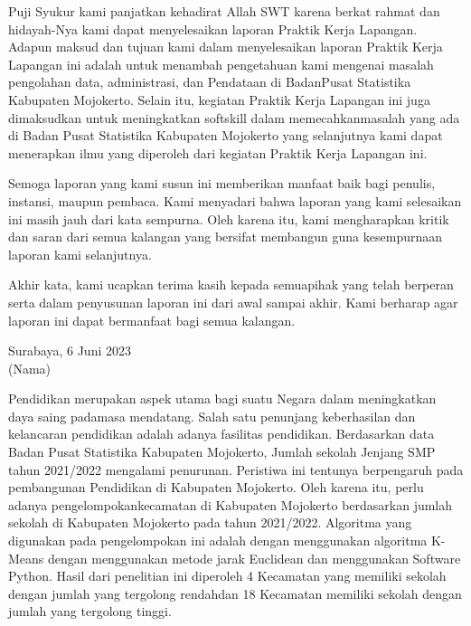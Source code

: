 \documentclass{LaporanPKL}
\begin{document}



\Awal
\HalamanJudul
\HalamanPengesahan
\Keaslian
\newpage
\KataPengantar

Puji  Syukur  kami  panjatkan  kehadirat  Allah  SWT  karena  berkat  rahmat  dan hidayah-Nya kami dapat menyelesaikan laporan Praktik Kerja Lapangan. Adapun maksud dan tujuan kami dalam menyelesaikan laporan Praktik Kerja Lapangan ini adalah  untuk  menambah  pengetahuan  kami  mengenai  masalah  pengolahan  data, administrasi, dan Pendataan di BadanPusat Statistika Kabupaten Mojokerto. Selain itu,  kegiatan Praktik  Kerja  Lapangan ini  juga  dimaksudkan  untuk  meningkatkan softskill dalam memecahkanmasalah yang ada di Badan Pusat Statistika Kabupaten Mojokerto  yang  selanjutnya kami dapat  menerapkan  ilmu  yang diperoleh  dari kegiatan Praktik Kerja Lapangan ini.

Semoga  laporan  yang  kami  susun  ini  memberikan  manfaat  baik  bagi  penulis, instansi, maupun pembaca. Kami menyadari bahwa laporan yang kami selesaikan ini masih jauh dari kata sempurna. Oleh karena itu, kami mengharapkan kritik dan saran dari semua kalangan yang bersifat membangun guna kesempurnaan laporan kami selanjutnya.

Akhir kata, kami ucapkan terima kasih kepada semuapihak yang telah berperan serta  dalam  penyusunan  laporan  ini  dari  awal  sampai  akhir.  Kami  berharap  agar laporan ini dapat bermanfaat bagi semua kalangan.

\vspace*{7cm}
\begin{flushright}
	Surabaya, 6 Juni 2023\\[5ex]
	(Nama)
\end{flushright}

\begin{Abstrak}
	Pendidikan  merupakan  aspek  utama  bagi  suatu  Negara  dalam  meningkatkan daya   saing padamasa   mendatang.   Salah   satu   penunjang   keberhasilan   dan kelancaran pendidikan adalah adanya fasilitas pendidikan. Berdasarkan data Badan Pusat   Statistika   Kabupaten   Mojokerto,   Jumlah   sekolah   Jenjang   SMP   tahun 2021/2022   mengalami   penurunan.   Peristiwa   ini   tentunya   berpengaruh   pada pembangunan Pendidikan di Kabupaten Mojokerto. Oleh karena itu, perlu adanya pengelompokankecamatan di Kabupaten Mojokerto berdasarkan jumlah sekolah di Kabupaten  Mojokerto  pada  tahun  2021/2022. Algoritma  yang  digunakan  pada pengelompokan  ini  adalah  dengan  menggunakan  algoritma  K-Means  dengan menggunakan  metode jarak Euclidean dan  menggunakan Software  Python. Hasil dari  penelitian  ini  diperoleh  4  Kecamatan  yang  memiliki sekolah dengan  jumlah yang tergolong  rendahdan  18  Kecamatan  memiliki sekolah dengan  jumlah  yang tergolong tinggi.
\end{Abstrak}
\end{document}
